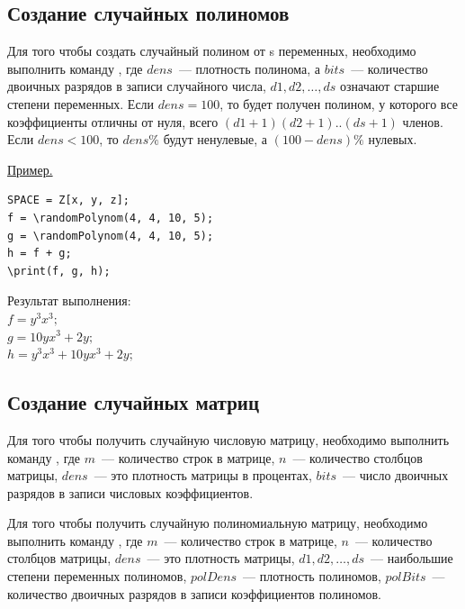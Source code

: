 \subsection{Создание случайных полиномов}
Для того чтобы создать случайный полином от s переменных,  необходимо выполнить команду 
, 
где $dens$~--- плотность полинома,  а $bits$~--- количество двоичных разрядов в записи случайного числа, 
$d1, d2, \ldots, ds$ означают старшие степени переменных. Если $dens=100$, то будет получен полином, у которого все коэффициенты 
отличны от нуля, всего $(d1+1)(d2+1)..(ds+1)$ членов. Если $dens<100$, то 
$dens\%$ будут ненулевые, а $(100-dens)\%$ нулевых.


\smallskip

\underline{Пример. }

\vspace*{-3mm}

\begin{verbatim}
SPACE = Z[x, y, z];
f = \randomPolynom(4, 4, 10, 5);
g = \randomPolynom(4, 4, 10, 5);
h = f + g;
\print(f, g, h);
\end{verbatim}

Результат выполнения: \\ 
$f = y^{3}x^{3}; $\\
$g = 10yx^{3}+2y; $\\
$h = y^{3}x^{3}+10yx^{3}+2y; $

\subsection{Создание случайных матриц}


Для того чтобы получить случайную числовую матрицу,  необходимо выполнить команду 
, 
где $m$~--- количество строк в матрице,  $n$~--- количество столбцов матрицы,  $dens$~--- это плотность матрицы в процентах,  $bits$~--- число двоичных разрядов в записи  числовых коэффициентов. 

Для того чтобы получить случайную полиномиальную матрицу,  необходимо выполнить команду 
, 
где $m$~--- количество строк в матрице,  $n$~--- количество столбцов матрицы,  $dens$~--- это плотность матрицы,  $d1, d2,\ldots, ds$~--- наибольшие степени переменных полиномов,  $polDens$~--- плотность полиномов,  $polBits$~--- количество двоичных разрядов в записи коэффициентов полиномов. 

